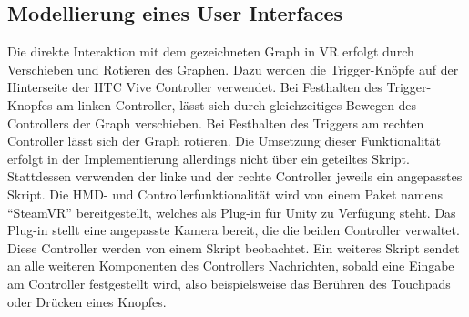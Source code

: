 \documentclass[12pt, a4paper]{article}
\begin{document}
\subsection{Modellierung eines User Interfaces}
Die direkte Interaktion mit dem gezeichneten Graph in VR erfolgt durch Verschieben und Rotieren des Graphen. Dazu werden die Trigger-Knöpfe auf der Hinterseite der HTC Vive Controller verwendet. Bei Festhalten des Trigger-Knopfes am linken Controller, lässt sich durch gleichzeitiges Bewegen des Controllers der Graph verschieben. Bei Festhalten des Triggers am rechten Controller lässt sich der Graph rotieren. Die Umsetzung dieser Funktionalität erfolgt in der Implementierung allerdings nicht über ein geteiltes Skript. Stattdessen verwenden der linke und der rechte Controller jeweils ein angepasstes Skript. Die HMD- und Controllerfunktionalität wird von einem Paket namens "`SteamVR"' bereitgestellt, welches als Plug-in für Unity zu Verfügung steht. Das Plug-in stellt eine angepasste Kamera bereit, die die beiden Controller verwaltet. Diese Controller werden von einem Skript beobachtet. Ein weiteres Skript sendet an alle weiteren Komponenten des Controllers Nachrichten, sobald eine Eingabe am Controller festgestellt wird, also beispielsweise das Berühren des Touchpads oder Drücken eines Knopfes.\\
\end{document}
